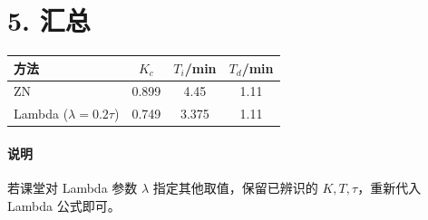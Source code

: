 \documentclass[UTF8,a4paper,11pt]{ctexart}
\begin{document}
\section*{5. 汇总}
\begin{center}
\begin{tabular}{lccc}
\toprule
方法 & $K_c$ & $T_i$/min & $T_d$/min\\
\midrule
ZN & 0.899 & 4.45 & 1.11\\
Lambda ($\lambda=0.2\tau$) & 0.749 & 3.375 & 1.11\\
\bottomrule
\end{tabular}
\end{center}

\paragraph{说明}
若课堂对 Lambda 参数 $\lambda$ 指定其他取值，保留已辨识的 $K,T,\tau$，重新代入 Lambda 公式即可。
\end{document}
